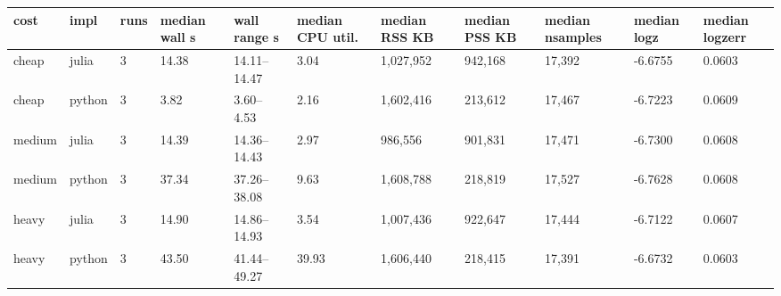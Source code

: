 \begin{tabular}{lllllllllll}
\toprule
cost & impl & runs & median wall s & wall range s & median CPU util. & median RSS KB & median PSS KB & median nsamples & median logz & median logzerr \\
\midrule
cheap & julia & 3 & 14.38 & 14.11--14.47 & 3.04 & 1,027,952 & 942,168 & 17,392 & -6.6755 & 0.0603 \\
cheap & python & 3 & 3.82 & 3.60--4.53 & 2.16 & 1,602,416 & 213,612 & 17,467 & -6.7223 & 0.0609 \\
medium & julia & 3 & 14.39 & 14.36--14.43 & 2.97 & 986,556 & 901,831 & 17,471 & -6.7300 & 0.0608 \\
medium & python & 3 & 37.34 & 37.26--38.08 & 9.63 & 1,608,788 & 218,819 & 17,527 & -6.7628 & 0.0608 \\
heavy & julia & 3 & 14.90 & 14.86--14.93 & 3.54 & 1,007,436 & 922,647 & 17,444 & -6.7122 & 0.0607 \\
heavy & python & 3 & 43.50 & 41.44--49.27 & 39.93 & 1,606,440 & 218,415 & 17,391 & -6.6732 & 0.0603 \\
\bottomrule
\end{tabular}

